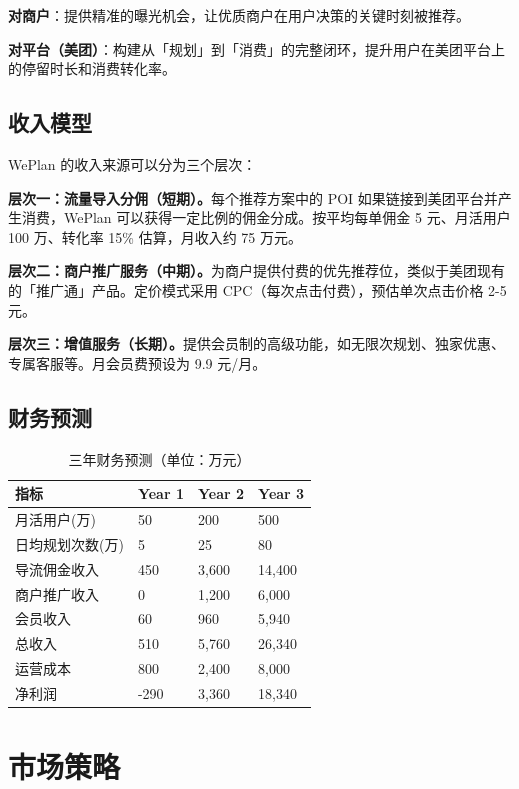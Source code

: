 \documentclass[12pt,a4paper]{ctexart}
\begin{document}
\textbf{对商户}：提供精准的曝光机会，让优质商户在用户决策的关键时刻被推荐。

\textbf{对平台（美团）}：构建从「规划」到「消费」的完整闭环，提升用户在美团平台上的停留时长和消费转化率。

\subsection{收入模型}

WePlan 的收入来源可以分为三个层次：

\textbf{层次一：流量导入分佣（短期）。}每个推荐方案中的 POI 如果链接到美团平台并产生消费，WePlan 可以获得一定比例的佣金分成。按平均每单佣金 5 元、月活用户 100 万、转化率 15\% 估算，月收入约 75 万元。

\textbf{层次二：商户推广服务（中期）。}为商户提供付费的优先推荐位，类似于美团现有的「推广通」产品。定价模式采用 CPC（每次点击付费），预估单次点击价格 2-5 元。

\textbf{层次三：增值服务（长期）。}提供会员制的高级功能，如无限次规划、独家优惠、专属客服等。月会员费预设为 9.9 元/月。

\subsection{财务预测}

\begin{table}[H]
\centering
\caption{三年财务预测（单位：万元）}
\label{tab:financial-forecast}
\renewcommand{\arraystretch}{1.3}
\begin{tabular}{p{3.5cm} p{2.5cm} p{2.5cm} p{2.5cm}}
\toprule
\textbf{指标} & \textbf{Year 1} & \textbf{Year 2} & \textbf{Year 3} \\
\midrule
月活用户(万) & 50 & 200 & 500 \\
日均规划次数(万) & 5 & 25 & 80 \\
导流佣金收入 & 450 & 3,600 & 14,400 \\
商户推广收入 & 0 & 1,200 & 6,000 \\
会员收入 & 60 & 960 & 5,940 \\
总收入 & 510 & 5,760 & 26,340 \\
运营成本 & 800 & 2,400 & 8,000 \\
净利润 & -290 & 3,360 & 18,340 \\
\bottomrule
\end{tabular}
\end{table}

\section{市场策略}
\end{document}
